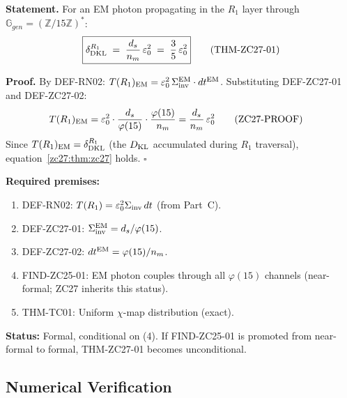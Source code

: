 \documentclass[12pt, a4paper]{article}
\begin{document}
\begin{formalbox}[title={THM-ZC27-01: $\delta_{\rm DKL}^{R_1}
  = (d_s/n_m)\,\varepsilon_0^2$ ~~(CONJ-ZC26-01 Proved)}]
\label{zc27:thm:main}
\textbf{Statement.}
For an EM photon propagating in the $R_1$ layer through
$\mathbb{G}_{gen} = (\mathbb{Z}/15\mathbb{Z})^*$:
\begin{equation}
  \boxed{
  \delta_{\rm DKL}^{R_1}
  \;=\;
  \frac{d_s}{n_m}\,\varepsilon_0^2
  \;=\;
  \frac{3}{5}\,\varepsilon_0^2
  }
  \tag{THM-ZC27-01}\label{zc27:thm:zc27}
\end{equation}

\medskip
\textbf{Proof.}
By DEF-RN02: $T(R_1)_{\rm EM} = \varepsilon_0^2\,
\Sigma_{\rm inv}^{\rm EM}\cdot dt^{\rm EM}$.
Substituting DEF-ZC27-01 and DEF-ZC27-02:
\begin{align}
  T(R_1)_{\rm EM}
  &= \varepsilon_0^2 \cdot \frac{d_s}{\varphi(15)}
    \cdot \frac{\varphi(15)}{n_m}
  = \frac{d_s}{n_m}\,\varepsilon_0^2
  \tag{ZC27-PROOF}
\end{align}
Since $T(R_1)_{\rm EM} = \delta_{\rm DKL}^{R_1}$
(the $D_{\rm KL}$ accumulated during $R_1$ traversal),
equation~\eqref{zc27:thm:zc27} holds.
\hfill$\square$

\medskip
\textbf{Required premises:}
\begin{enumerate}[leftmargin=*, noitemsep]
  \item DEF-RN02: $T(R_1) = \varepsilon_0^2\Sigma_{\rm inv}\,dt$
    (from Part~C).
  \item DEF-ZC27-01: $\Sigma_{\rm inv}^{\rm EM} = d_s/\varphi(15)$.
  \item DEF-ZC27-02: $dt^{\rm EM} = \varphi(15)/n_m$.
  \item FIND-ZC25-01: EM photon couples through all $\varphi(15)$
    channels (near-formal; ZC27 inherits this status).
  \item THM-TC01: Uniform $\chi$-map distribution (exact).
\end{enumerate}

\medskip
\textbf{Status:}
Formal, conditional on (4). If FIND-ZC25-01 is promoted from
near-formal to formal, THM-ZC27-01 becomes unconditional.
\end{formalbox}

\subsection{Numerical Verification}
\label{zc27:sec:numerical}
\end{document}
